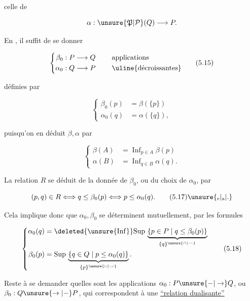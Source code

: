 
celle de

\[
 \alpha:\unsure{\mathfrak P|\mathcal P}(Q)\longrightarrow P.
\]

 En , il suffit de se donner

\[
 \left\{\begin{aligned}
  \beta_0 &:P\longrightarrow Q\\
  \alpha_0 &:Q\longrightarrow P
 \end{aligned}\right.\qquad
 \begin{aligned}&\text{applications}\\&\text{\uline{décroissantes}}\end{aligned}
 \tag*{(5.15)}
\]

 définies par

\[
 \left\{\begin{aligned}
 \beta_0(p)&=\beta(\{p\})\\
 \alpha_0(q)&=\alpha(\{q\}),
 \end{aligned}\right.
\]

puisqu'on en déduit $\beta,\alpha$ par

\[
 \left\{\begin{aligned}
 \beta(A)&=\mathop{\mathrm{Inf}}_{p\in A}\beta(p)\\
 \alpha(B)&=\mathop{\mathrm{Inf}}_{q\in B}\alpha(q).
 \end{aligned}\right.
 \tag*{(5.16)}
\]

La relation $R$ se déduit de la donnée de $\beta_0$, ou du choix de $\alpha_0$, par

\[
 (p,q)\in R\Longleftrightarrow q\leq\beta_0(p)\Longleftrightarrow p\leq\alpha_0(q).
 \tag*{(5.17)\unsure{\textsubscript{e}|\textsubscript{a}|.}}
\]

Cela implique donc que $\alpha_0,\beta_0$ se déterminent mutuellement, par les formules

\[
 \left\{\begin{aligned}
 \alpha_0(q)&=\deleted{\unsure{\mathrm{Inf}}}\mathrm{Sup}\,
 \underbrace{\{p\in P\mid q\leq\beta_0(p)\}}_{\{q\}^{\unsure{\cap|\frown}}}\\
 \beta_0(p)&=\mathrm{Sup}\,
 \underbrace{\{q\in Q\mid p\leq\alpha_0(q)\}}_{\{p\}^{\unsure{\cup|\smile}}}.
 \end{aligned}\right.
 \tag*{(5.18)}
\]

Reste à se demander quelles sont les applications $\alpha_0:P\unsure{-|\to}Q$, ou $\beta_0:Q\unsure{\to|-}P$, qui correspondent à une \uline{``relation dualisante''}
